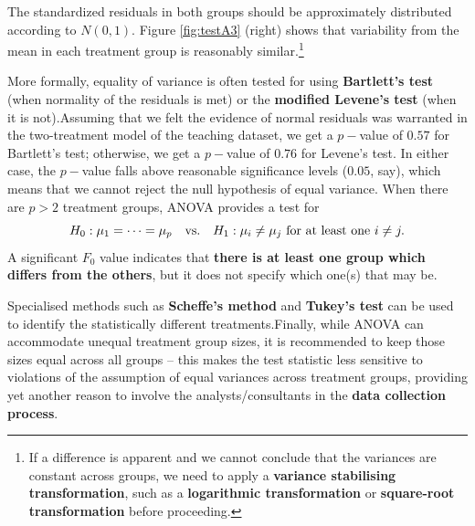 The standardized residuals in both groups should be approximately distributed according to $N(0,1)$. Figure \ref{fig:testA3} (right) shows that variability from the mean in each treatment group is reasonably similar.\footnote{If a difference is apparent and we cannot conclude that the variances are constant across groups, we need to apply a \textbf{variance stabilising transformation}, such as a \textbf{logarithmic transformation} or \textbf{square-root transformation} before proceeding.} \par More formally, equality of variance is often tested for using \textbf{Bartlett's test} (when normality of the residuals is met) or the \textbf{modified Levene's test} (when it is not).\newl Assuming that we felt the evidence of normal residuals was warranted in the two-treatment model of the teaching dataset, we get a $p-$value of $0.57$ for Bartlett's test; otherwise, we get a $p-$value  of $0.76$ for Levene's test. In either case, the $p-$value falls above reasonable significance levels ($0.05$, say), which means that we cannot reject the null hypothesis of equal variance. 
\newpage\noindent
When there are $p>2$ treatment groups, ANOVA provides a test for $$H_{0}: \mu_{1}  = \cdots = \mu_{p}\quad\text{vs.\@}\quad H_{1}: \mu_{i} \neq \mu_{j} \text{ for at least one } i \neq j.$$ A significant $F_0$ value indicates that \textbf{there is at least one group which differs from the others}, but it does not specify which one(s) that may be. \par Specialised methods such as \textbf{Scheffe's method} and \textbf{Tukey's test} can be used to identify the statistically different treatments.\newl Finally, while ANOVA can accommodate unequal treatment group sizes, it is recommended to keep those sizes equal across all groups -- this  makes the test statistic less sensitive to violations of the assumption of equal variances across treatment groups, providing yet another reason to involve the analysts/consultants in  the \textbf{data collection process}.


